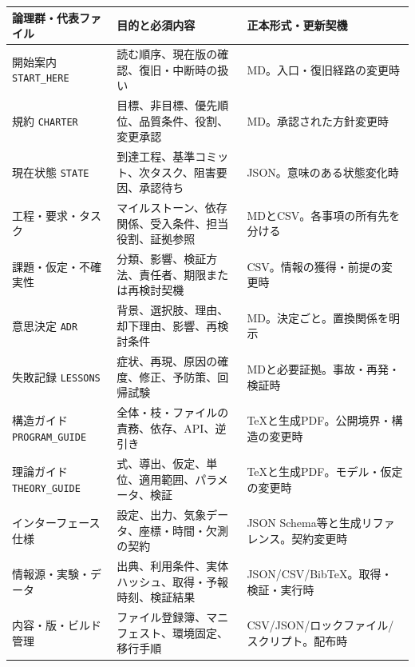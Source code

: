 \documentclass[11pt,a4paper]{article}
\newcounter{none}
\begin{document}
{\def\LTcaptype{none} %
\begin{longtable}[]{@{}
  >{\raggedright\arraybackslash}p{}
  >{\raggedright\arraybackslash}p{}
  >{\raggedright\arraybackslash}p{}@{}}
\toprule\noalign{}
\begin{minipage}[b]{\linewidth}\raggedright
論理群・代表ファイル
\end{minipage} & \begin{minipage}[b]{\linewidth}\raggedright
目的と必須内容
\end{minipage} & \begin{minipage}[b]{\linewidth}\raggedright
正本形式・更新契機
\end{minipage} \\
\midrule\noalign{}
\endhead
\bottomrule\noalign{}
\endlastfoot
開始案内 \texttt{START\_HERE} &
読む順序、現在版の確認、復旧・中断時の扱い &
MD。入口・復旧経路の変更時 \\
規約 \texttt{CHARTER} & 目標、非目標、優先順位、品質条件、役割、変更承認
& MD。承認された方針変更時 \\
現在状態 \texttt{STATE} &
到達工程、基準コミット、次タスク、阻害要因、承認待ち &
JSON。意味のある状態変化時 \\
工程・要求・タスク &
マイルストーン、依存関係、受入条件、担当役割、証拠参照 &
MDとCSV。各事項の所有先を分ける \\
課題・仮定・不確実性 &
分類、影響、検証方法、責任者、期限または再検討契機 &
CSV。情報の獲得・前提の変更時 \\
意思決定 \texttt{ADR} & 背景、選択肢、理由、却下理由、影響、再検討条件 &
MD。決定ごと。置換関係を明示 \\
失敗記録 \texttt{LESSONS} &
症状、再現、原因の確度、修正、予防策、回帰試験 &
MDと必要証拠。事故・再発・検証時 \\
構造ガイド \texttt{PROGRAM\_GUIDE} &
全体・枝・ファイルの責務、依存、API、逆引き &
TeXと生成PDF。公開境界・構造の変更時 \\
理論ガイド \texttt{THEORY\_GUIDE} &
式、導出、仮定、単位、適用範囲、パラメータ、検証 &
TeXと生成PDF。モデル・仮定の変更時 \\
インターフェース仕様 & 設定、出力、気象データ、座標・時間・欠測の契約 &
JSON Schema等と生成リファレンス。契約変更時 \\
情報源・実験・データ &
出典、利用条件、実体ハッシュ、取得・予報時刻、検証結果 &
JSON/CSV/BibTeX。取得・検証・実行時 \\
内容・版・ビルド管理 & ファイル登録簿、マニフェスト、環境固定、移行手順
& CSV/JSON/ロックファイル/スクリプト。配布時 \\
\end{longtable}
}
\end{document}
